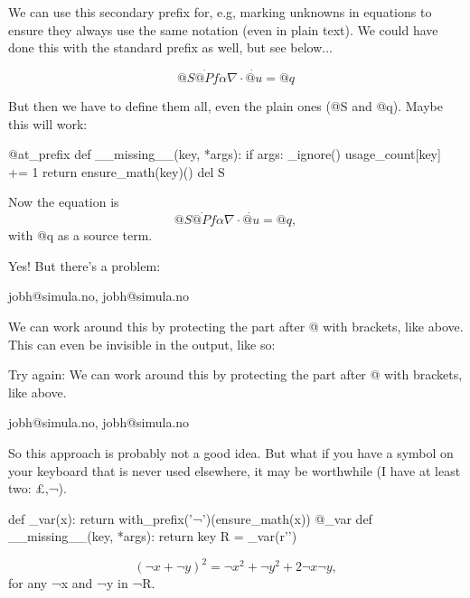\documentclass{article}
\begin{document}
We can use this secondary prefix for, e.g, marking unknowns in equations to
ensure they always use the same notation (even in plain text). We could have done this with
the standard prefix as well, but see below...

\begin{equation}
@S\dot{@Pf} \alpha \nabla \cdot \dot{@u} = @q
\end{equation}

But then we have to define them all, even the plain ones (@S and @q). Maybe this will work:

{%
@at_prefix
def __missing__(key, *args):
   if args:
       _ignore()
   usage_count[key] += 1
   return ensure_math(key)()
del S
}%

Now the equation is
\begin{equation}
@S\dot{@Pf} \alpha \nabla \cdot \dot{@u} = @q,
\end{equation}
with @q as a source term.

Yes! But there's a problem:

jobh@simula.no, jobh@{simula.no}

We can work around this by protecting the part after @ with brackets, like above.
This can even be invisible in the output, like so:


Try again:
We can work around this by protecting the part after @ with brackets, like above.

jobh@simula.no, jobh@{simula.no}

So this approach is probably not a good idea. But what if you have a symbol on
your keyboard that is never used elsewhere, it may be worthwhile (I have at least two: £,¬).

{%
def _var(x):
    return with_prefix('¬')(ensure_math(x))
@_var
def __missing__(key, *args):
   return key
R = _var(r'')
}%

\begin{equation}
(¬x+¬y)^2 = ¬x^2+¬y^2+2¬x¬y,
\end{equation}
for any ¬x and ¬y in ¬R.
\end{document}
